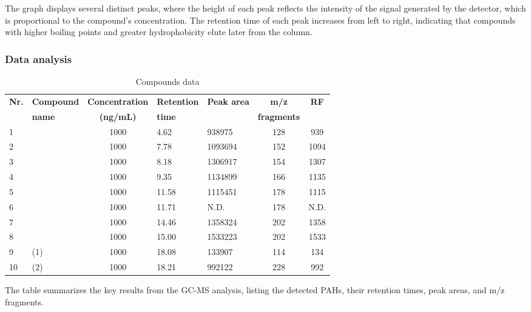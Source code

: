 \documentclass{article}
\begin{document}
The graph displays several distinct peaks, where the height of each peak reflects the
intensity of the signal generated by the detector, which is proportional to the compound's
concentration. The retention time of each peak increases from left to right, indicating
that compounds with higher boiling points and greater hydrophobicity elute later from the
column.
\vspace*{.5cm}
\subsubsection{Data analysis}
\begin{table}[ht!]
    \centering
    \caption{Compounds data}
    \begin{tabular}{@{}llcllcc@{}}
        \toprule
        \textbf{Nr.} & \textbf{Compound} & \textbf{Concentration} & \textbf{Retention} & \textbf{Peak area} & \textbf{m/z} & \textbf{RF}\\
        & \textbf{name} & \textbf{(ng/mL)} & \textbf{time} & & \textbf{fragments}\\
        \midrule
        1 & \nameref{ch:naphthalene} & 1000 & 4.62 & 938975 & 128 & 939\\
        2 & \nameref{ch:acenaphthylene} & 1000 & 7.78 & 1093694 & 152 & 1094\\
        3 & \nameref{ch:acenaphthene} & 1000 & 8.18 & 1306917 & 154 & 1307\\
        4 & \nameref{ch:fluorene} & 1000 & 9.35 & 1134899 & 166 & 1135\\
        5 & \nameref{ch:anthracene} & 1000 & 11.58 & 1115451 & 178 & 1115\\
        6 & \nameref{ch:phenanthrene} & 1000 & 11.71 & N.D. & 178 & N.D.\\
        7 & \nameref{ch:pyrene} & 1000 & 14.46 & 1358324 & 202 & 1358\\
        8 & \nameref{ch:fluoranthene} & 1000 & 15.00 & 1533223 & 202 & 1533\\
        9 & \nameref{ch:chrysene} (1) & 1000 & 18.08 & 133907 & 114 & 134\\
        10 & \nameref{ch:chrysene} (2) & 1000 & 18.21 & 992122 & 228 & 992\\
        \bottomrule
    \end{tabular}
    \label{tab:calibration-data}
\end{table}
\vspace*{.5cm}
The table summarizes the key results from the GC-MS analysis, listing the detected PAHs,
their retention times, peak areas, and m/z fragments.
\end{document}
